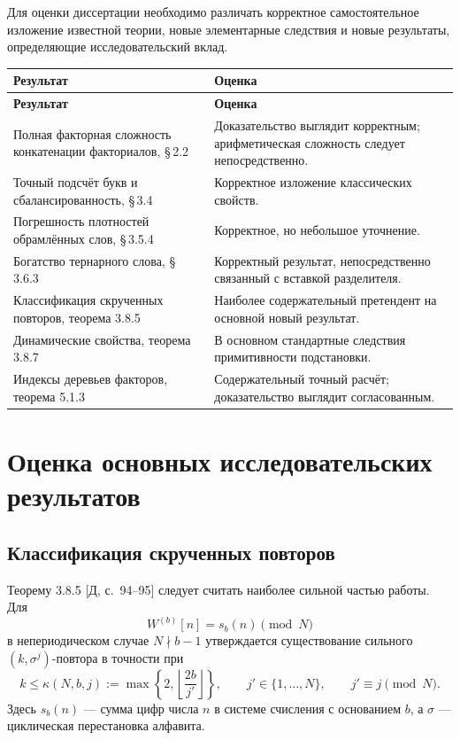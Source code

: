 \documentclass[12pt,a4paper]{article}
\newcommand{\sref}[1]{\textnormal{[Д, с.~#1]}}
\begin{document}
Для оценки диссертации необходимо различать корректное самостоятельное
изложение известной теории, новые элементарные следствия и новые
результаты, определяющие исследовательский вклад.

\begin{longtable}{@{}>{\raggedright\arraybackslash}p{}
                      >{\raggedright\arraybackslash}p{}@{}}
\toprule
\textbf{Результат} & \textbf{Оценка}\\
\midrule
\endfirsthead
\toprule
\textbf{Результат} & \textbf{Оценка}\\
\midrule
\endhead
\bottomrule
\endfoot
Полная факторная сложность конкатенации факториалов, \S\,2.2
& Доказательство выглядит корректным; арифметическая сложность
следует непосредственно.\\[5pt]
Точный подсчёт букв и сбалансированность, \S\,3.4
& Корректное изложение классических свойств.\\[5pt]
Погрешность плотностей обрамлённых слов, \S\,3.5.4
& Корректное, но небольшое уточнение.\\[5pt]
Богатство тернарного слова, \S\,3.6.3
& Корректный результат, непосредственно связанный
с вставкой разделителя.\\[5pt]
Классификация скрученных повторов, теорема 3.8.5
& Наиболее содержательный претендент
на основной новый результат.\\[5pt]
Динамические свойства, теорема 3.8.7
& В основном стандартные следствия примитивности подстановки.\\[5pt]
Индексы деревьев факторов, теорема 5.1.3
& Содержательный точный расчёт; доказательство выглядит согласованным.\\
\end{longtable}

\section{Оценка основных исследовательских результатов}

\subsection{Классификация скрученных повторов}

Теорему 3.8.5 \sref{94--95} следует считать наиболее сильной частью
работы. Для
\[
  W^{(b)}[n]=s_b(n)\pmod N
\]
в непериодическом случае $N\nmid b-1$ утверждается существование сильного
$(k,\sigma^j)$-повтора в точности при
\[
  k\le \kappa(N,b,j):=
  \max\left\{2,\left\lfloor\frac{2b}{j'}\right\rfloor\right\},
  \qquad j'\in\{1,\ldots,N\},\qquad j'\equiv j\pmod N.
\]
Здесь $s_b(n)$ --- сумма цифр числа $n$ в системе счисления
с основанием $b$, а $\sigma$ --- циклическая перестановка алфавита.
\end{document}
